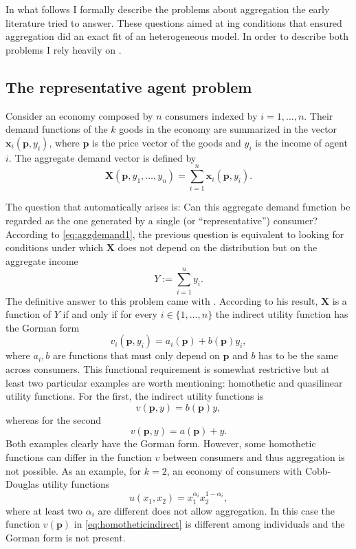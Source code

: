 \documentclass[english, a4paper, 12pt]{article}
\begin{document}
In what follows I formally describe the problems about aggregation the early literature tried to answer. These questions aimed at ing conditions that ensured aggregation did an exact fit of an heterogeneous model. In order to describe both problems I rely heavily on \cite{VarianBook}.

\subsection{The representative agent problem} \label{ssec:RepAgent}
Consider an economy composed by $n$ consumers indexed by $i = 1, \ldots, n$. Their demand functions of the $k$ goods in the economy are summarized in the vector $\mathbf{x}_{i}(\mathbf{p}, y_{i})$, where $\mathbf{p}$ is the price vector of the goods and $y_{i}$ is the income of agent $i$. The aggregate demand vector is defined by
	\begin{equation} \label{eq:aggdemand1}
		\mathbf{X}(\mathbf{p}, y_{1}, \ldots, y_{n}) = \sum_{i=1}^{n} \mathbf{x}_{i}(\mathbf{p},y_{i}).
	\end{equation}

The question that automatically arises is: Can this aggregate demand function be regarded as the one generated by a single (or ``representative'') consumer? According to \eqref{eq:aggdemand1}, the previous question is equivalent to looking for conditions under which $\mathbf{X}$ does not depend on the distribution but on the aggregate income
	$$Y := \sum_{i=1}^{n} y_{i}.$$
The definitive answer to this problem came with \cite{Gorman53}. According to his result, $\mathbf{X}$ is a function of $Y$ if and only if for every $i \in \{1,\ldots,n\}$ the indirect utility function has the Gorman form
	$$v_{i}(\mathbf{p}, y_{i}) = a_{i}(\mathbf{p}) + b(\mathbf{p})y_{i},$$ 
where $a_{i}, b$ are functions that must only depend on $\mathbf{p}$ and $b$ has to be the same across consumers. This functional requirement is somewhat restrictive but at least two particular examples are worth mentioning: homothetic and quasilinear utility functions. For the first, the indirect utility functions is
	\begin{equation} \label{eq:homotheticindirect}
		v(\mathbf{p}, y) = b(\mathbf{p})y,
	\end{equation}
whereas for the second
	$$v(\mathbf{p}, y) = a(\mathbf{p}) + y.$$
Both examples clearly have the Gorman form. However, some homothetic functions can differ in the function $v$ between consumers and thus aggregation is not possible. As an example, for $k = 2$, an economy of consumers with Cobb-Douglas utility functions
	$$u(x_{1}, x_{2}) = x_{1}^{\alpha_{i}}x_{2}^{1-\alpha_{i}},$$
where at least two $\alpha_{i}$ are different does not allow aggregation. In this case the function $v(\mathbf{p})$ in \eqref{eq:homotheticindirect} is different among individuals and the Gorman form is not present.
\end{document}
